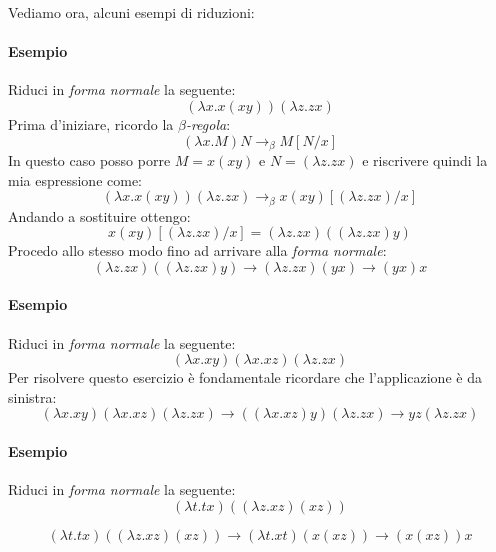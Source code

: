 \documentclass[12pt, a4paper]{report}
\theoremstyle{definition}
\newcommand{\red}{\to_\beta}
\begin{document}
Vediamo ora, alcuni esempi di riduzioni:
\paragraph*{Esempio}
Riduci in \emph{forma normale} la seguente:
\[(\lambda x.x(xy))(\lambda z.zx)\]
Prima d'iniziare, ricordo la \emph{$\beta$-regola}:
\[(\lambda x.M)N\red M[N/x]\]
In questo caso posso porre \(M=x(xy)\) e \(N=(\lambda z.zx)\) e riscrivere quindi
la mia espressione come:
\[(\lambda x.x(xy))(\lambda z.zx)\red x(xy)[(\lambda z.zx)/x]\]
Andando a sostituire ottengo:
\[x(xy)[(\lambda z.zx)/x]=(\lambda z.zx)((\lambda z.zx)y)\]
Procedo allo stesso modo fino ad arrivare alla \emph{forma normale}:
\[(\lambda z.zx)((\lambda z.zx)y)\to(\lambda z.zx)(yx)\to (yx)x\]

\paragraph*{Esempio}
Riduci in \emph{forma normale} la seguente:
\[(\lambda x.xy)(\lambda x.xz)(\lambda z.zx)\]
Per risolvere questo esercizio è fondamentale ricordare che l'applicazione è da
sinistra:
\[(\lambda x.xy)(\lambda x.xz)(\lambda z.zx)\to((\lambda x.xz)y)(\lambda z.zx)
\to yz(\lambda z.zx )\]

\paragraph*{Esempio}
Riduci in \emph{forma normale} la seguente:
\[(\lambda t.tx)((\lambda z.xz)(xz))\]

\[(\lambda t.tx)((\lambda z.xz)(xz))\to (\lambda t.xt)(x(xz))\to (x(xz))x\]
\end{document}
